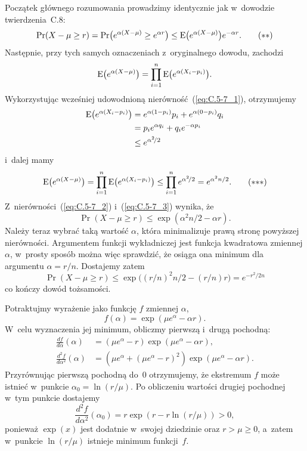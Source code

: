 Początek głównego rozumowania prowadzimy identycznie jak w~dowodzie twierdzenia~C.8:
\[
	\Pr(X-\mu\ge r) = \Pr\bigl(e^{\alpha(X-\mu)}\ge e^{\alpha r}\bigr) \le \operatorname{E}\bigl(e^{\alpha(X-\mu)}\bigr)e^{-\alpha r}. \tag{$**$}\label{eq:C.5-7_2}
\]
Następnie, przy tych samych oznaczeniach z~oryginalnego dowodu, zachodzi
\[
	\operatorname{E}\bigl(e^{\alpha(X-\mu)}\bigr) = \prod_{i=1}^n\operatorname{E}\bigl(e^{\alpha(X_i-p_i)}\bigr).
\]
Wykorzystując wcześniej udowodnioną nierówność~(\ref{eq:C.5-7_1}), otrzymujemy
\begin{align*}
	\operatorname{E}\bigl(e^{\alpha(X_i-p_i)}\bigr) &= e^{\alpha(1-p_i)}p_i+e^{\alpha(0-p_i)}q_i \\
	&= p_ie^{\alpha q_i}+q_ie^{-\alpha p_i} \\
	&\le e^{\alpha^2\!/2}
\end{align*}
i~dalej mamy
\[
	\E\bigl(e^{\alpha(X-\mu)}\bigr) = \prod_{i=1}^n\E\bigl(e^{\alpha(X_i-p_i)}\bigr) \le \prod_{i=1}^ne^{\alpha^2\!/2} = e^{\alpha^2n/2}. \tag{${**}*$}\label{eq:C.5-7_3}
\]
Z~nierówności~(\ref{eq:C.5-7_2}) i~(\ref{eq:C.5-7_3}) wynika, że
\[
	\Pr(X-\mu\ge r) \le \exp(\alpha^2n/2-\alpha r).
\]
Należy teraz wybrać taką wartość $\alpha$, która minimalizuje prawą stronę powyższej nierówności. Argumentem funkcji wykładniczej jest funkcja kwadratowa zmiennej $\alpha$, w~prosty sposób można więc sprawdzić, że osiąga ona minimum dla argumentu $\alpha=r/n$. Dostajemy zatem
\[
	\Pr(X-\mu\ge r) \le \exp\bigl((r/n)^2n/2-(r/n)r\bigr) = e^{-r^2\!/{2n}}
\]
co kończy dowód tożsamości.

\exercise{} %
Potraktujmy wyrażenie jako funkcję $f$ zmiennej $\alpha$,
\[
	f(\alpha) = \exp(\mu e^\alpha-\alpha r).
\]
W~celu wyznaczenia jej minimum, obliczmy pierwszą i~drugą pochodną:
\begin{align*}
	\frac{df}{d\alpha}(\alpha) &= (\mu e^\alpha-r)\exp(\mu e^\alpha-\alpha r), \\
	\frac{d^2\!f}{d\alpha^2}(\alpha) &= \left(\mu e^\alpha+(\mu e^\alpha-r)^2\right)\exp(\mu e^\alpha-\alpha r).
\end{align*}
Przyrównując pierwszą pochodną do~0 otrzymujemy, że ekstremum $f$ może istnieć w~punkcie $\alpha_0=\ln(r/\mu)$. Po obliczeniu wartości drugiej pochodnej w~tym punkcie dostajemy
\[
	\frac{d^2\!f}{d\alpha^2}(\alpha_0) = r\exp(r-r\ln(r/\mu)) > 0,
\]
ponieważ $\exp(x)$ jest dodatnie w~swojej dziedzinie oraz $r>\mu\ge0$, a~zatem w~punkcie $\ln(r/\mu)$ istnieje minimum funkcji~$f$.

\problems


